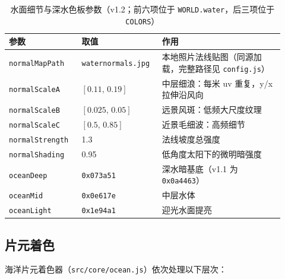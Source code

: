\documentclass[UTF8, a4paper, 11pt]{ctexart}
\newcommand{\file}[1]{\texttt{#1}}
\begin{document}
\begin{table}[H]
\centering
\caption{水面细节与深水色板参数（v1.2；前六项位于 \texttt{WORLD.water}，后三项位于 \texttt{COLORS}）}
\label{tab:water}
\small
\begin{tabular}{@{}p{0.25\linewidth}p{0.25\linewidth}p{0.42\linewidth}@{}}
\toprule
\textbf{参数} & \textbf{取值} & \textbf{作用} \\
\midrule
\file{normalMapPath} & \texttt{waternormals.jpg} & 本地照片法线贴图（同源加载，完整路径见 \file{config.js}） \\
\file{normalScaleA} & $[0.11,\,0.19]$ & 中层细浪：每米 uv 重复，y/x 拉伸沿风向 \\
\file{normalScaleB} & $[0.025,\,0.05]$ & 远景风斑：低频大尺度纹理 \\
\file{normalScaleC} & $[0.5,\,0.85]$ & 近景毛细波：高频细节 \\
\file{normalStrength} & 1.3 & 法线坡度总强度 \\
\file{normalShading} & 0.95 & 低角度太阳下的微明暗强度 \\
\file{oceanDeep} & \texttt{0x073a51} & 深水暗基底（v1.1 为 \texttt{0x0a4463}） \\
\file{oceanMid} & \texttt{0x0e617e} & 中层水体 \\
\file{oceanLight} & \texttt{0x1e94a1} & 迎光水面提亮 \\
\bottomrule
\end{tabular}
\end{table}

\subsection{片元着色}

海洋片元着色器（\file{src/core/ocean.js}）依次处理以下层次：
\end{document}
